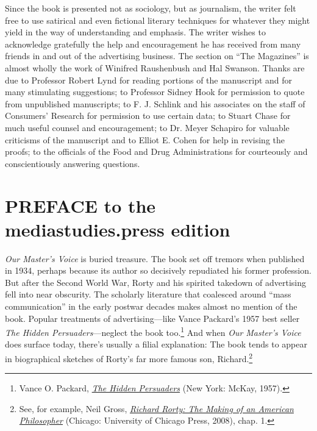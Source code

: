 \documentclass[openany,nobib]{tufte-book}
\let\oldchapter\chapter
\def\chapter{%
  \setcounter{footnote}{0}%
  \oldchapter
}
\begin{document}
Since the book is presented not as sociology, but as journalism, the
writer felt free to use satirical and even fictional literary techniques
for whatever they might yield in the way of understanding and emphasis.
The writer wishes to acknowledge gratefully the help and encouragement
he has received from many friends in and out of the advertising
business. The section on ``The Magazines'' is almost wholly the work of
Winifred Raushenbush and Hal Swanson. Thanks are due to Professor Robert
Lynd for reading portions of the manuscript and for many stimulating
suggestions; to Professor Sidney Hook for permission to quote from
unpublished manuscripts; to F. J. Schlink and his associates on the
staff of Consumers' Research for permission to use certain data; to
Stuart Chase for much useful counsel and encouragement; to Dr. Meyer
Schapiro for valuable criticisms of the manuscript and to Elliot E.
Cohen for help in revising the proofs; to the officials of the Food and
Drug Administrations for courteously and conscientiously answering
questions.



\chapter{PREFACE to the mediastudies.press edition}
\label{ch:prefacemsp}

  
 \emph{Our Master's Voice} is buried treasure. The book set
off tremors when published in 1934, perhaps because its author so
decisively repudiated his former profession. But after the Second World
War, Rorty and his spirited takedown of advertising fell into near
obscurity. The scholarly literature that coalesced around ``mass
communication'' in the early postwar decades makes almost no mention of
the book. Popular treatments of advertising---like Vance Packard's 1957
best seller \emph{The Hidden Persuaders}---neglect the book too.\footnote{Vance O. Packard, \emph{\href{http://www.worldcat.org/oclc/245181}{The
  Hidden Persuaders}} (New York: McKay, 1957).} And
when \emph{Our Master's Voice} does surface today, there's usually a
filial explanation: The book tends to appear in biographical sketches of
Rorty's far more famous son, Richard.\footnote{See, for example, Neil Gross,
  \emph{\href{http://www.worldcat.org/oclc/474963500}{Richard Rorty: The
  Making of an American Philosopher}} (Chicago: University of Chicago
  Press, 2008), chap. 1.}
\end{document}
